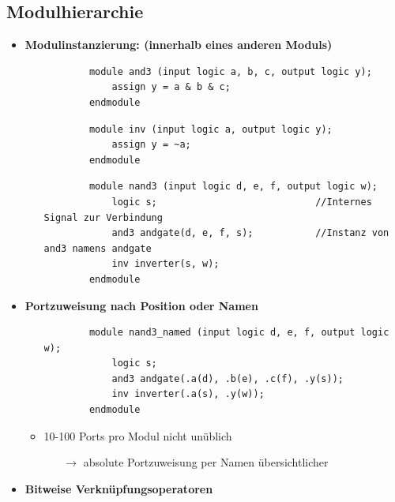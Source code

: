 \documentclass[11pt,a4paper]{article}
\begin{document}
\subsection{Modulhierarchie}
\begin{itemize}
\item \textbf{Modulinstanzierung: (innerhalb eines anderen Moduls)}
	\begin{itemize}
	
	\item[]
		\begin{lstlisting}
		module and3 (input logic a, b, c, output logic y);
			assign y = a & b & c;
		endmodule
		\end{lstlisting}		
	\item[]	
		\begin{lstlisting}
		module inv (input logic a, output logic y);
			assign y = ~a;
		endmodule
		\end{lstlisting}		
	\item[]
		\begin{lstlisting}
		module nand3 (input logic d, e, f, output logic w);
			logic s; 							//Internes Signal zur Verbindung
			and3 andgate(d, e, f, s);  			//Instanz von and3 namens andgate
			inv inverter(s, w);				
		endmodule
		\end{lstlisting}	
	\end{itemize}
	
\pagebreak	
	
\item \textbf{Portzuweisung nach Position oder Namen}
	\begin{itemize}
	\item[]
		\begin{lstlisting}
		module nand3_named (input logic d, e, f, output logic w);
			logic s;
			and3 andgate(.a(d), .b(e), .c(f), .y(s));
			inv inverter(.a(s), .y(w)); 	
		endmodule
		\end{lstlisting}
	\item 10-100 Ports pro Modul nicht unüblich
		\begin{itemize}
		\item[$\rightarrow$] absolute Portzuweisung per Namen übersichtlicher	
		\end{itemize}
		
	
	\end{itemize}
	
\item \textbf{Bitweise Verknüpfungsoperatoren}
	\begin{itemize}
	

\end{itemize}
\end{itemize}
\end{document}
